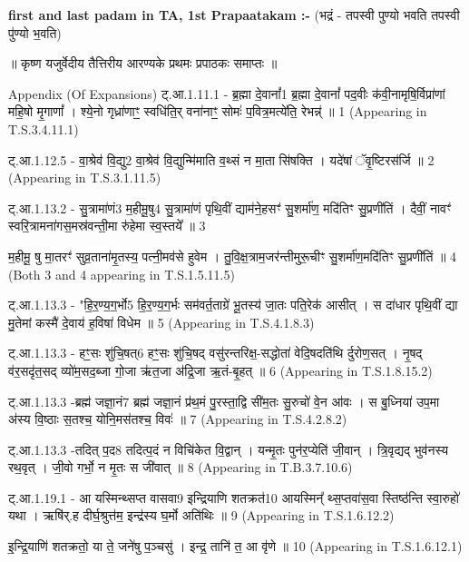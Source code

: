 \documentclass[17pt]{extarticle}
\begin{document}
\textbf{first and last padam in TA, 1st Prapaatakam :-} \newline
(भद्रं - तपस्वी पुण्यो भवति तपस्वी पु॑ण्यो भ॒वति) \newline 


॥ कृष्ण यजुर्वेदीय तैत्तिरीय आरण्यके प्रथमः प्रपाठकः समाप्तः ॥

Appendix (Of Expansions)
ट्.आ.1.11.1 - ब्र॒ह्मा दे॒वानां᳚{1}
ब्र॒ह्मा दे॒वानां᳚ पद॒वीः क॑वी॒नामृषि॒र्विप्रा॑णां महि॒षो मृ॒गाणां᳚ । 
श्ये॒नो गृध्रा॑णाꣳ॒॒ स्वधि॑ति॒र् वना॑नाꣳ॒॒ सोमः॑ प॒वित्र॒मत्ये॑ति॒ रेभन्न्॑ ॥ {1}
(Appearing in T.S.3.4.11.1)

ट्.आ.1.12.5 - वा॒श्रेव॑ वि॒द्यु{2} 
वा॒श्रेव॑ वि॒द्युन्मि॑माति व॒थ्सं न मा॒ता सि॑षक्ति । 
यदे॑षां ॅवृ॒ष्टिरस॑र्जि ॥ {2} 
(Appearing in T.S.3.1.11.5)

ट्.आ.1.13.2 - सु॒त्रामा॑णं{3} म॒हीमू॒षु{4}
सु॒त्रामा॑णं पृथि॒वीं द्याम॑ने॒हसꣳ॑ सु॒शर्मा॑ण॒ मदि॑तिꣳ सु॒प्रणी॑तिं । 
दैवीं॒ नावꣳ॑ स्वरि॒त्रामना॑गस॒मस्र॑वन्ती॒मा रु॑हेमा स्व॒स्तये᳚ ॥ {3}

म॒हीमू॒ षु मा॒तरꣳ॑ सुव्र॒ताना॑मृ॒तस्य॒ पत्नी॒मव॑से हुवेम । 
तु॒वि॒क्ष॒त्राम॒जर॑न्तीमुरू॒चीꣳ सु॒शर्मा॑ण॒मदि॑तिꣳ सु॒प्रणी॑तिं ॥ {4} 
(Both {3} and {4} appearing in T.S.1.5.11.5)

ट्.आ.1.13.3 - "हि॒र॒ण्य॒ग॒र्भो{5} 
हि॒र॒ण्य॒ग॒र्भः सम॑वर्त॒ताग्रे॑ भू॒तस्य॑ जा॒तः पति॒रेक॑ आसीत् । 
स दा॑धार पृथि॒वीं द्या मु॒तेमां कस्मै॑ दे॒वाय॑ ह॒विषा॑ विधेम ॥ {5}
(Appearing in T.S.4.1.8.3)

ट्.आ.1.13.3 - हꣳ॒॒सः शु॑चि॒षत्{6} 
हꣳ॒॒सः शु॑चि॒षद् वसु॑रन्तरिक्ष॒-सद्धोता॑ वेदि॒षदति॑थि र्दुरोण॒सत् । 
नृ॒षद् व॑र॒सदृ॑त॒सद् व्यो॑म॒सद॒ब्जा गो॒जा ऋ॑त॒जा अ॑द्रि॒जा ऋ॒तं-बृ॒हत् ॥ {6} 
(Appearing in T.S.1.8.15.2)

ट्.आ.1.13.3 -ब्रह्म॑ जज्ञा॒नं{7} 
ब्रह्म॑ जज्ञा॒नं प्र॑थ॒मं पु॒रस्ता॒द्वि सी॑म॒तः सु॒रुचो॑ वे॒न आ॑वः । 
स बु॒ध्निया॑ उप॒मा अ॑स्य वि॒ष्ठाः स॒तश्च॒ योनि॒मस॑तश्च॒ विवः॑ ॥ {7}
(Appearing in T.S.4.2.8.2)

ट्.आ.1.13.3 -तदित् प॒द{8}
तदित्प॒दं न विचि॑केत वि॒द्वान् । यन्मृ॒तः पुन॑र॒प्येति॑ जी॒वान् । 
त्रि॒वृद्यद् भुव॑नस्य रथ॒वृत् । जी॒वो गर्भो॒ न मृ॒तः स जी॑वात् ॥ {8}
(Appearing in T.B.3.7.10.6)

ट्.आ.1.19.1 - आ यस्मिन्थ्सप्त वासवा{9} इन्द्रियाणि शतक्रत॑{10} 
आयस्मिन्᳚ थ्स॒प्तवा॑स॒वा स्तिष्ठ॑न्ति स्वा॒रुहो॑ यथा ।
ऋषि॑र्.ह दीर्घ॒श्रुत्त॑म॒ इन्द्र॑स्य घ॒र्मो अति॑थिः ॥ {9}
(Appearing in T.S.1.6.12.2)

इ॒न्द्रि॒याणि॑ शतक्रतो॒ या ते॒ जने॑षु प॒ञ्चसु॑ । 
इन्द्र॒ तानि॑ त॒ आ वृ॑णे ॥ {10} 
(Appearing in T.S.1.6.12.1)
\end{document}

